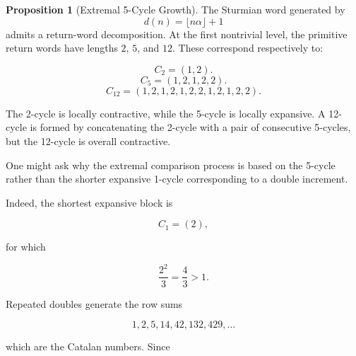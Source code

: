 \documentclass[12pt, oneside]{article}
\numberwithin{equation}{section}
\theoremstyle{definition}
\newtheorem{proposition}{Proposition}[section]
\theoremstyle{plain}
\theoremstyle{remark}
\begin{document}
\begin{proposition}[Extremal 5-Cycle Growth]
The Sturmian word generated by
\[
d(n)=\lfloor n\alpha\rfloor+1
\]
admits a return-word decomposition.  At the first nontrivial level, the primitive
return words have lengths $2$, $5$, and $12$. These correspond respectively to:

\[
C_2=(1,2).
\]
\[
C_5=(1,2,1,2,2).
\]
\[
C_{12}=(1,2,1,2,1,2,2,1,2,1,2,2).
\]

The 2-cycle is locally contractive, while the 5-cycle is locally expansive. A 12-cycle
is formed by concatenating the 2-cycle with a pair of consecutive 5-cycles, but the 
12-cycle is overall contractive.



One might ask why the extremal comparison process is based on the
5-cycle rather than the shorter expansive 1-cycle corresponding to a
double increment.

Indeed, the shortest expansive block is

\[
C_1=(2),
\]

for which

\[
\frac{2^2}{3} = \frac43 > 1.
\]





Repeated doubles generate the row sums

\[
1,2,5,14,42,132,429,\ldots
\]

which are the Catalan numbers.
Since


\end{proposition}
\end{document}
